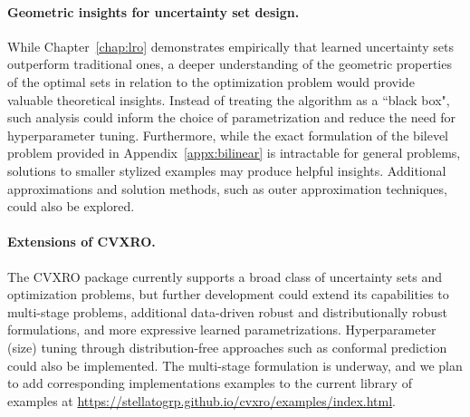 
\paragraph{Geometric insights for uncertainty set design.}
While Chapter~\ref{chap:lro} demonstrates empirically that learned uncertainty sets outperform traditional ones, a deeper understanding of the geometric properties of the optimal sets in relation to the optimization problem would provide valuable theoretical insights.
Instead of treating the algorithm as a ``black box", such analysis could inform the choice of parametrization and reduce the need for hyperparameter tuning.
Furthermore, while the exact formulation of the bilevel problem provided in Appendix~\ref{appx:bilinear} is intractable for general problems, solutions to smaller stylized examples may produce helpful insights. Additional approximations and solution methods, such as outer approximation techniques, could also be explored.


\paragraph{Extensions of \gls{CVXRO}.}
The \gls{CVXRO} package currently supports a broad class of uncertainty sets and optimization problems, but further development could extend its capabilities to multi-stage problems, additional data-driven robust and distributionally robust formulations, and more expressive learned parametrizations. Hyperparameter (size) tuning through distribution-free approaches such as conformal prediction could also be implemented. 
The multi-stage formulation is underway, and we plan to add corresponding implementations examples to the current library of examples at \url{https://stellatogrp.github.io/cvxro/examples/index.html}. 
